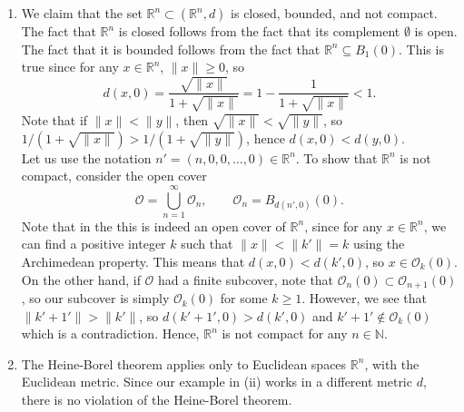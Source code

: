\documentclass[10pt]{article}
\newcommand\norm[1]{\lVert #1 \rVert}
\def\O{\mathcal{O}}
\begin{document}
\begin{enumerate}
                \item We claim that the set $\mathbb{R}^n \subset (\mathbb{R}^n, d)$ is closed, bounded, and not compact.
                The fact that $\mathbb{R}^n$ is closed follows from the fact that its complement $\emptyset$ is open.
                The fact that it is bounded follows from the fact that $\mathbb{R}^n \subseteq B_1(0)$. This is true
                since for any $x \in \mathbb{R}^n$, $\norm{x} \geq 0$, so
                \[
                        d(x, 0) = \frac{\sqrt{\norm{x}}}{1 + \sqrt{\norm{x}}} = 1 - \frac{1}{1 + \sqrt{\norm{x}}} < 1.
                \]
                Note that if $\norm{x} < \norm{y}$, then $\sqrt{\norm{x}} < \sqrt{\norm{y}}$, so 
                $1 / (1 + \sqrt{\norm{x}}) > 1 /(1 + \sqrt{\norm{y}})$, hence $d(x, 0) < d(y, 0)$. \\
                
                Let us use the notation $n' = (n, 0, 0, \dots, 0) \in \mathbb{R}^n$.
                To show that $\mathbb{R}^n$ is not compact, consider the open cover 
                \[
                        \O = \bigcup_{n = 1}^\infty \O_n, \qquad \O_n = B_{d(n', 0)}(0).
                \]
                Note that in the this is indeed an open cover of $\mathbb{R}^n$, since for any $x \in \mathbb{R}^n$, we can find a positive
                integer $k$ such that $\norm{x} < \norm{k'} = k$ using the Archimedean property. This means that $d(x, 0) < d(k', 0)$, so $x \in \O_k(0)$.
                On the other hand, if $\O$ had a finite subcover, note that $\O_{n}(0) \subset \O_{n + 1}(0)$, so our subcover is simply $\O_{k}(0)$
                for some $k \geq 1$. However, we see that $\norm{k' + 1'} > \norm{k'}$, so $d(k' + 1', 0) > d(k', 0)$ and $k' + 1' \notin \O_{k}(0)$
                which is a contradiction. Hence, $\mathbb{R}^n$ is not compact for any $n \in \mathbb{N}$.

                \item The Heine-Borel theorem applies only to Euclidean spaces $\mathbb{R}^n$, with the Euclidean metric.
                Since our example in (ii) works in a different metric $d$, there is no violation of the Heine-Borel theorem.

        \end{enumerate}
\end{document}
